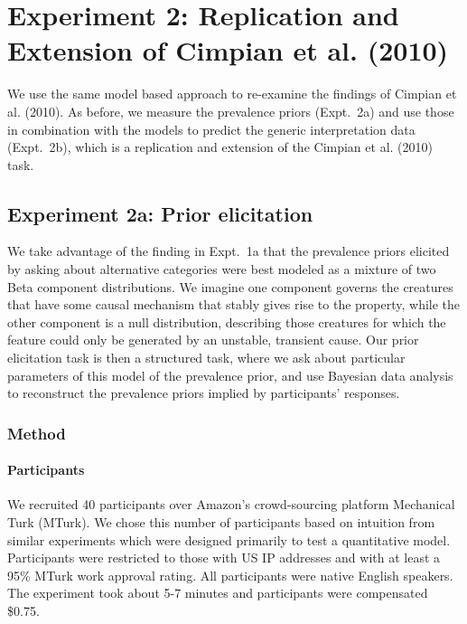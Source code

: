 \documentclass[floatsintext,doc]{apa6}
\let\oldparagraph\paragraph
\renewcommand{\paragraph}[1]{\oldparagraph{#1}\mbox{}}
\begin{document}
\hypertarget{preliminary-study-replication-and-extension-of-cimpian-et-al.-2010}{%
\section{Experiment 2: Replication and Extension of Cimpian et al. (2010)}\label{preliminary-study-replication-and-extension-of-cimpian-et-al.-2010}}

We use the same model based approach to re-examine the findings of Cimpian et al. (2010). As before, we measure the prevalence priors (Expt.~2a) and use those in combination with the models to predict the generic interpretation data (Expt.~2b), which is a replication and extension of the Cimpian et al. (2010) task. 

\subsection{Experiment 2a: Prior elicitation}

We take advantage of the finding in Expt.~1a that the prevalence priors elicited by asking about alternative categories were best modeled as a mixture of two Beta component distributions. 
We imagine one component governs the creatures that have some causal mechanism that stably gives rise to the property, while the other component is a null distribution, describing those creatures for which the feature could only be generated by an unstable, transient cause. 
Our prior elicitation task is then a structured task, where we ask about particular parameters of this model of the prevalence prior, and use Bayesian data analysis to reconstruct the prevalence priors implied by participants' responses. 


\subsubsection{Method}\label{method}

\paragraph{Participants}
We recruited 40 participants over Amazon's crowd-sourcing platform
Mechanical Turk (MTurk). We chose this number of participants based on
intuition from similar experiments which were designed primarily to test
a quantitative model. Participants were restricted to those with US IP
addresses and with at least a 95\% MTurk work approval rating. All
participants were native English speakers. The experiment took about 5-7
minutes and participants were compensated \$0.75.
\end{document}
